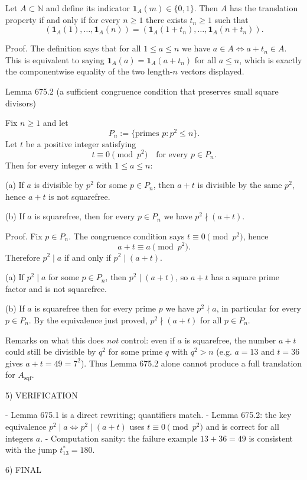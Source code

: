 Let $A\subset\mathbb N$ and define its indicator $\mathbf 1_A(m)\in\{0,1\}$. Then $A$ has the translation property if and only if for every $n\ge 1$ there exists $t_n\ge 1$ such that
\[
(\mathbf 1_A(1),\dots,\mathbf 1_A(n))=(\mathbf 1_A(1+t_n),\dots,\mathbf 1_A(n+t_n)).
\]

Proof.
The definition says that for all $1\le a\le n$ we have $a\in A\iff a+t_n\in A$. This is equivalent to saying $\mathbf 1_A(a)=\mathbf 1_A(a+t_n)$ for all $a\le n$, which is exactly the componentwise equality of the two length-$n$ vectors displayed.


Lemma 675.2 (a sufficient congruence condition that preserves small square divisors)

Fix $n\ge 1$ and let
\[
P_n:=\{\text{primes }p: p^2\le n\}.
\]
Let $t$ be a positive integer satisfying
\[
 t\equiv 0\pmod{p^2}\quad\text{for every }p\in P_n.
\]
Then for every integer $a$ with $1\le a\le n$:

(a) If $a$ is divisible by $p^2$ for some $p\in P_n$, then $a+t$ is divisible by the same $p^2$, hence $a+t$ is not squarefree.

(b) If $a$ is squarefree, then for every $p\in P_n$ we have $p^2\nmid (a+t)$.

Proof.
Fix $p\in P_n$. The congruence condition says $t\equiv 0\pmod{p^2}$, hence
\[
 a+t\equiv a\pmod{p^2}.
\]
Therefore $p^2\mid a$ if and only if $p^2\mid (a+t)$.

(a) If $p^2\mid a$ for some $p\in P_n$, then $p^2\mid(a+t)$, so $a+t$ has a square prime factor and is not squarefree.

(b) If $a$ is squarefree then for every prime $p$ we have $p^2\nmid a$, in particular for every $p\in P_n$. By the equivalence just proved, $p^2\nmid(a+t)$ for all $p\in P_n$.


Remarks on what this does \emph{not} control: even if $a$ is squarefree, the number $a+t$ could still be divisible by $q^2$ for some prime $q$ with $q^2>n$ (e.g. $a=13$ and $t=36$ gives $a+t=49=7^2$). Thus Lemma 675.2 alone cannot produce a full translation for $A_{\mathrm{sqf}}$.

5) VERIFICATION

- Lemma 675.1 is a direct rewriting; quantifiers match.
- Lemma 675.2: the key equivalence $p^2\mid a\iff p^2\mid(a+t)$ uses $t\equiv 0\pmod{p^2}$ and is correct for all integers $a$.
- Computation sanity: the failure example $13+36=49$ is consistent with the jump $t_{13}^*=180$.

6) FINAL

